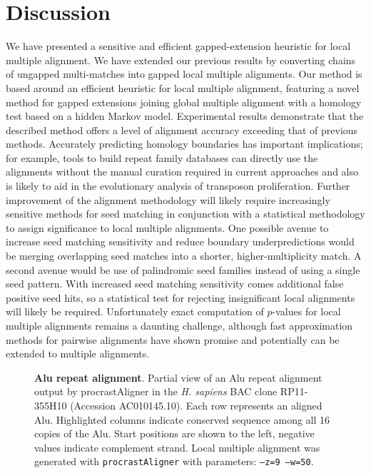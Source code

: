 \documentclass{llncs}
\begin{document}
\section{Discussion}
We have presented a sensitive and efficient gapped-extension heuristic for local
multiple alignment. We have extended our previous results by
converting chains of ungapped multi-matches into gapped local multiple
alignments. Our method is based around an efficient heuristic for
local multiple alignment, featuring a novel method for gapped
extensions joining global multiple alignment with a homology test based on a hidden Markov
model.  Experimental results demonstrate that the
described method offers a level of alignment accuracy exceeding
that of previous methods. Accurately predicting homology boundaries has important implications; for example, tools to build repeat family databases can directly use the alignments without the manual curation required in current approaches and also is likely to aid in the evolutionary analysis of transposon proliferation.  Further improvement of the alignment
methodology will likely require increasingly sensitive methods for
seed matching in conjunction with a statistical methodology to assign
significance to local multiple alignments.  One possible avenue to
increase seed matching sensitivity and reduce boundary
underpredictions would be merging overlapping seed matches into a
shorter, higher-multiplicity match.  A second avenue would be use of
palindromic seed families instead of using a single seed
pattern. With increased seed matching sensitivity comes additional
false positive seed hits, so a statistical test for rejecting
insignificant local alignments will likely be required.  Unfortunately exact
computation of $p$-values for local multiple alignments remains a
daunting challenge, although fast approximation methods for pairwise
alignments have shown promise\cite{repseek} and potentially can be
extended to multiple alignments\cite{ref-related1,Prakash2005}.
\begin{figure}[t!]
\centering {}
\vspace{-1.0cm}
\caption{\textbf{Alu repeat alignment}. Partial view of an Alu repeat alignment output by procrastAligner in the \emph{H. sapiens} BAC
clone RP11-355H10 (Accession AC010145.10). Each row represents an
aligned Alu. Highlighted columns indicate conserved sequence among all
16 copies of the Alu. Start positions are shown to the left, negative
values indicate complement strand.  Local multiple alignment was
generated with \texttt{procrastAligner} with parameters: \texttt{--z=9
--w=50}.  }
\label{fig-align}
\vspace{-0.3cm}
\end{figure}
\end{document}
